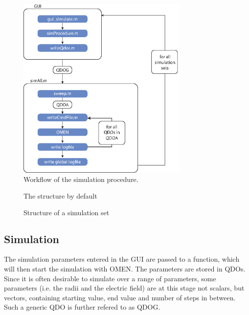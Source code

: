 			\begin{figure}
				\centering
				\includegraphics[width=0.75\textwidth]{Fig/workflow.eps}
				\caption{Workflow of the simulation procedure.}
				\label{fig:Workflow}
			\end{figure}
		
			\begin{figure}[htbp]
				\begin{minipage}[b]{0.59\textwidth}
				\caption{The \software structure by default}
				\label{dir:ToolboxTree}
			\end{minipage}
			\hfill
			\begin{minipage}[b]{0.39\textwidth}
			\caption{Structure of a simulation set}
			\label{dir:SimSetTree}
			\end{minipage}
			\end{figure}
			
		\subsection{Simulation}
		The simulation parameters entered in the GUI are passed to a function, which will then start the simulation with OMEN. The parameters are stored in QDOs. Since it is often desirable to simulate over a range of parameters, some parameters (i.e. the radii and the electric field) are at this stage not scalars, but vectors, containing starting value, end value and number of steps in between. Such a generic QDO is further refered to as QDOG.\\
		
